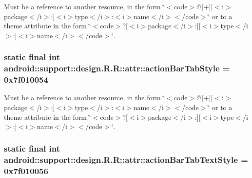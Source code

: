 Must be a reference to another resource, in the form \char`\"{}$<$code$>$@\mbox{[}+\mbox{]}\mbox{[}$<$i$>$package$<$/i$>$:\mbox{]}$<$i$>$type$<$/i$>$:$<$i$>$name$<$/i$>$$<$/code$>$\char`\"{} or to a theme attribute in the form \char`\"{}$<$code$>$?\mbox{[}$<$i$>$package$<$/i$>$:\mbox{]}\mbox{[}$<$i$>$type$<$/i$>$:\mbox{]}$<$i$>$name$<$/i$>$$<$/code$>$\char`\"{}. \hypertarget{classandroid_1_1support_1_1design_1_1_r_1_1attr_3371214b6099b3ec8242211aa1b02712}{
\subsubsection[{actionBarTabStyle}]{\setlength{\rightskip}{0pt plus 5cm}static final int android::support::design.R.R::attr::actionBarTabStyle = 0x7f010054}}
\label{classandroid_1_1support_1_1design_1_1_r_1_1attr_3371214b6099b3ec8242211aa1b02712}


Must be a reference to another resource, in the form \char`\"{}$<$code$>$@\mbox{[}+\mbox{]}\mbox{[}$<$i$>$package$<$/i$>$:\mbox{]}$<$i$>$type$<$/i$>$:$<$i$>$name$<$/i$>$$<$/code$>$\char`\"{} or to a theme attribute in the form \char`\"{}$<$code$>$?\mbox{[}$<$i$>$package$<$/i$>$:\mbox{]}\mbox{[}$<$i$>$type$<$/i$>$:\mbox{]}$<$i$>$name$<$/i$>$$<$/code$>$\char`\"{}. \hypertarget{classandroid_1_1support_1_1design_1_1_r_1_1attr_5aeecdc226c3f592819d7da075aad909}{
\subsubsection[{actionBarTabTextStyle}]{\setlength{\rightskip}{0pt plus 5cm}static final int android::support::design.R.R::attr::actionBarTabTextStyle = 0x7f010056}}
\label{classandroid_1_1support_1_1design_1_1_r_1_1attr_5aeecdc226c3f592819d7da075aad909}


